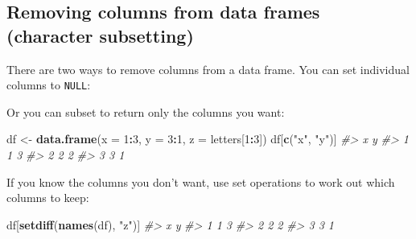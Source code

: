 \documentclass[]{book}
\newenvironment{Shaded}{\begin{snugshade}}{\end{snugshade}}
\newcommand{\KeywordTok}[1]{\textcolor[rgb]{0.13,0.29,0.53}{\textbf{#1}}}
\newcommand{\DataTypeTok}[1]{\textcolor[rgb]{0.13,0.29,0.53}{#1}}
\newcommand{\DecValTok}[1]{\textcolor[rgb]{0.00,0.00,0.81}{#1}}
\newcommand{\StringTok}[1]{\textcolor[rgb]{0.31,0.60,0.02}{#1}}
\newcommand{\CommentTok}[1]{\textcolor[rgb]{0.56,0.35,0.01}{\textit{#1}}}
\newcommand{\OtherTok}[1]{\textcolor[rgb]{0.56,0.35,0.01}{#1}}
\newcommand{\OperatorTok}[1]{\textcolor[rgb]{0.81,0.36,0.00}{\textbf{#1}}}
\newcommand{\NormalTok}[1]{#1}
\theoremstyle{definition}
\theoremstyle{definition}
\theoremstyle{definition}
\theoremstyle{remark}
\begin{document}
\subsection{Removing columns from data frames (character
subsetting)}\label{removing-columns-from-data-frames-character-subsetting}

There are two ways to remove columns from a data frame. You can set
individual columns to \texttt{NULL}:

\begin{Shaded}
\end{Shaded}

Or you can subset to return only the columns you want:

\begin{Shaded}
\begin{Highlighting}[]
\NormalTok{df <-}\StringTok{ }\KeywordTok{data.frame}\NormalTok{(}\DataTypeTok{x =} \DecValTok{1}\OperatorTok{:}\DecValTok{3}\NormalTok{, }\DataTypeTok{y =} \DecValTok{3}\OperatorTok{:}\DecValTok{1}\NormalTok{, }\DataTypeTok{z =}\NormalTok{ letters[}\DecValTok{1}\OperatorTok{:}\DecValTok{3}\NormalTok{])}
\NormalTok{df[}\KeywordTok{c}\NormalTok{(}\StringTok{"x"}\NormalTok{, }\StringTok{"y"}\NormalTok{)]}
\CommentTok{#>   x y}
\CommentTok{#> 1 1 3}
\CommentTok{#> 2 2 2}
\CommentTok{#> 3 3 1}
\end{Highlighting}
\end{Shaded}

If you know the columns you don't want, use set operations to work out
which columns to keep:

\begin{Shaded}
\begin{Highlighting}[]
\NormalTok{df[}\KeywordTok{setdiff}\NormalTok{(}\KeywordTok{names}\NormalTok{(df), }\StringTok{"z"}\NormalTok{)]}
\CommentTok{#>   x y}
\CommentTok{#> 1 1 3}
\CommentTok{#> 2 2 2}
\CommentTok{#> 3 3 1}
\end{Highlighting}
\end{Shaded}
\end{document}
